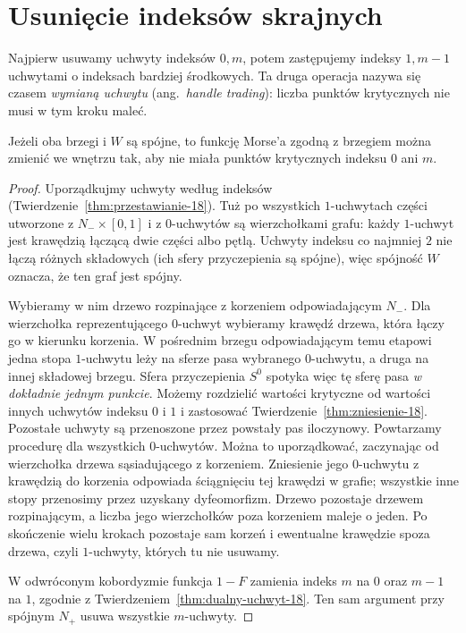 \section{Usunięcie indeksów skrajnych}
\label{sec:skrajne-hc-19}

Najpierw usuwamy uchwyty indeksów
$0,m$, potem zastępujemy indeksy
$1,m-1$ uchwytami o indeksach
bardziej środkowych. Ta druga
operacja nazywa się czasem
\emph{wymianą uchwytu}
(ang.\ \emph{handle trading}):
liczba punktów krytycznych
nie musi w tym kroku maleć.

\begin{lemat}
\label{lem:zero-m-hc-19}
Jeżeli oba brzegi i $W$ są spójne,
to funkcję Morse'a zgodną z brzegiem
można zmienić we wnętrzu tak, aby
nie miała punktów krytycznych
indeksu $0$ ani $m$.
\end{lemat}
\begin{proof}
Uporządkujmy uchwyty według indeksów
(Twierdzenie~\ref{thm:przestawianie-18}).
Tuż po wszystkich $1$-uchwytach
części utworzone z $N_-\times[0,1]$
i z $0$-uchwytów są wierzchołkami
grafu: każdy $1$-uchwyt jest krawędzią
łączącą dwie części albo pętlą.
Uchwyty indeksu co najmniej $2$
nie łączą różnych składowych
(ich sfery przyczepienia są spójne),
więc spójność $W$ oznacza,
że ten graf jest spójny.

Wybieramy w nim drzewo rozpinające
z korzeniem odpowiadającym $N_-$.
Dla wierzchołka reprezentującego
$0$-uchwyt wybieramy krawędź drzewa,
która łączy go w kierunku korzenia.
W pośrednim brzegu odpowiadającym
temu etapowi jedna stopa
$1$-uchwytu leży na sferze pasa
wybranego $0$-uchwytu, a druga
na innej składowej brzegu.
Sfera przyczepienia $S^0$
spotyka więc tę sferę pasa
\emph{w dokładnie jednym punkcie}.
Możemy rozdzielić wartości
krytyczne od wartości innych
uchwytów indeksu $0$ i $1$
i zastosować
Twierdzenie~\ref{thm:zniesienie-18}.
Pozostałe uchwyty są przenoszone
przez powstały pas iloczynowy.
Powtarzamy procedurę dla
wszystkich $0$-uchwytów.
Można to uporządkować, zaczynając od wierzchołka drzewa
sąsiadującego z korzeniem. Zniesienie jego $0$-uchwytu
z krawędzią do korzenia odpowiada ściągnięciu tej krawędzi
w grafie; wszystkie inne stopy przenosimy przez uzyskany
dyfeomorfizm. Drzewo pozostaje drzewem rozpinającym,
a liczba jego wierzchołków poza korzeniem maleje o jeden.
Po skończenie wielu krokach pozostaje sam korzeń i ewentualne
krawędzie spoza drzewa, czyli $1$-uchwyty, których tu nie usuwamy.

W odwróconym kobordyzmie
funkcja $1-F$ zamienia indeks $m$
na $0$ oraz $m-1$ na $1$,
zgodnie z
Twierdzeniem~\ref{thm:dualny-uchwyt-18}.
Ten sam argument przy spójnym
$N_+$ usuwa wszystkie $m$-uchwyty.
\end{proof}

